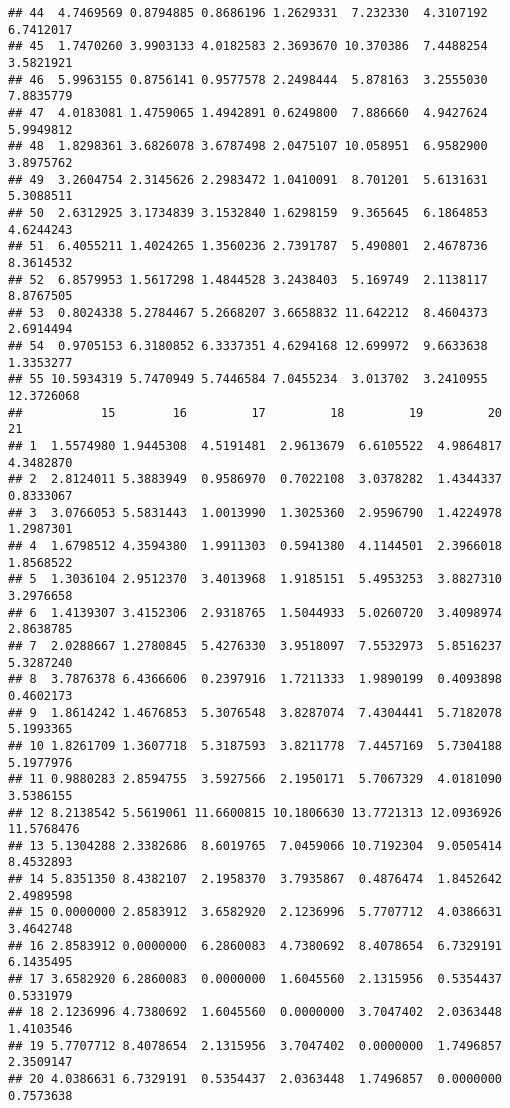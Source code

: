 \documentclass[
]{article}
\begin{document}
\begin{verbatim}
## 44  4.7469569 0.8794885 0.8686196 1.2629331  7.232330  4.3107192  6.7412017
## 45  1.7470260 3.9903133 4.0182583 2.3693670 10.370386  7.4488254  3.5821921
## 46  5.9963155 0.8756141 0.9577578 2.2498444  5.878163  3.2555030  7.8835779
## 47  4.0183081 1.4759065 1.4942891 0.6249800  7.886660  4.9427624  5.9949812
## 48  1.8298361 3.6826078 3.6787498 2.0475107 10.058951  6.9582900  3.8975762
## 49  3.2604754 2.3145626 2.2983472 1.0410091  8.701201  5.6131631  5.3088511
## 50  2.6312925 3.1734839 3.1532840 1.6298159  9.365645  6.1864853  4.6244243
## 51  6.4055211 1.4024265 1.3560236 2.7391787  5.490801  2.4678736  8.3614532
## 52  6.8579953 1.5617298 1.4844528 3.2438403  5.169749  2.1138117  8.8767505
## 53  0.8024338 5.2784467 5.2668207 3.6658832 11.642212  8.4604373  2.6914494
## 54  0.9705153 6.3180852 6.3337351 4.6294168 12.699972  9.6633638  1.3353277
## 55 10.5934319 5.7470949 5.7446584 7.0455234  3.013702  3.2410955 12.3726068
##           15        16         17         18         19         20         21
## 1  1.5574980 1.9445308  4.5191481  2.9613679  6.6105522  4.9864817  4.3482870
## 2  2.8124011 5.3883949  0.9586970  0.7022108  3.0378282  1.4344337  0.8333067
## 3  3.0766053 5.5831443  1.0013990  1.3025360  2.9596790  1.4224978  1.2987301
## 4  1.6798512 4.3594380  1.9911303  0.5941380  4.1144501  2.3966018  1.8568522
## 5  1.3036104 2.9512370  3.4013968  1.9185151  5.4953253  3.8827310  3.2976658
## 6  1.4139307 3.4152306  2.9318765  1.5044933  5.0260720  3.4098974  2.8638785
## 7  2.0288667 1.2780845  5.4276330  3.9518097  7.5532973  5.8516237  5.3287240
## 8  3.7876378 6.4366606  0.2397916  1.7211333  1.9890199  0.4093898  0.4602173
## 9  1.8614242 1.4676853  5.3076548  3.8287074  7.4304441  5.7182078  5.1993365
## 10 1.8261709 1.3607718  5.3187593  3.8211778  7.4457169  5.7304188  5.1977976
## 11 0.9880283 2.8594755  3.5927566  2.1950171  5.7067329  4.0181090  3.5386155
## 12 8.2138542 5.5619061 11.6600815 10.1806630 13.7721313 12.0936926 11.5768476
## 13 5.1304288 2.3382686  8.6019765  7.0459066 10.7192304  9.0505414  8.4532893
## 14 5.8351350 8.4382107  2.1958370  3.7935867  0.4876474  1.8452642  2.4989598
## 15 0.0000000 2.8583912  3.6582920  2.1236996  5.7707712  4.0386631  3.4642748
## 16 2.8583912 0.0000000  6.2860083  4.7380692  8.4078654  6.7329191  6.1435495
## 17 3.6582920 6.2860083  0.0000000  1.6045560  2.1315956  0.5354437  0.5331979
## 18 2.1236996 4.7380692  1.6045560  0.0000000  3.7047402  2.0363448  1.4103546
## 19 5.7707712 8.4078654  2.1315956  3.7047402  0.0000000  1.7496857  2.3509147
## 20 4.0386631 6.7329191  0.5354437  2.0363448  1.7496857  0.0000000  0.7573638

\end{verbatim}
\end{document}
